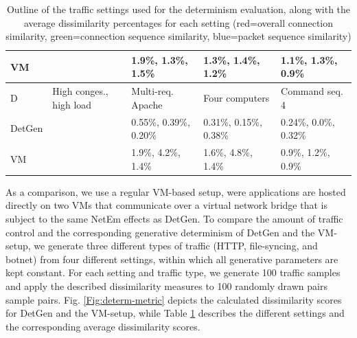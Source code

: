 \documentclass[sigconf]{acmart}
\begin{document}
\begin{table}
\begin{tabular}{p{1cm}|p{3.2cm}|p{2.7cm}|p{2.7cm}|p{2.7cm}}
VM & &\footnotesize \textcolor{myred}{1.9\%}, \textcolor{mygreen}{1.3\%}, \textcolor{myblue}{1.5\%}&
 \footnotesize \textcolor{myred}{1.3\%}, \textcolor{mygreen}{1.4\%}, \textcolor{myblue}{1.2\%}&
 \footnotesize \textcolor{myred}{1.1\%}, \textcolor{mygreen}{1.3\%}, \textcolor{myblue}{0.9\%}\\ \hline \hline
D& High conges., high load & Multi-req. Apache & Four computers & Command seq. 4\\ \hline
DetGen &&\footnotesize \textcolor{myred}{0.55\%}, \textcolor{mygreen}{0.39\%}, \textcolor{myblue}{0.20\%}&
 \footnotesize \textcolor{myred}{0.31\%}, \textcolor{mygreen}{0.15\%}, \textcolor{myblue}{0.38\%}&
 \footnotesize \textcolor{myred}{0.24\%}, \textcolor{mygreen}{0.0\%}, \textcolor{myblue}{0.32\%}\\ \hline \hline
VM & &\footnotesize \textcolor{myred}{1.9\%}, \textcolor{mygreen}{4.2\%}, \textcolor{myblue}{1.4\%}&
 \footnotesize \textcolor{myred}{1.6\%}, \textcolor{mygreen}{4.8\%}, \textcolor{myblue}{1.4\%}&
 \footnotesize \textcolor{myred}{0.9\%}, \textcolor{mygreen}{1.2\%}, \textcolor{myblue}{0.9\%}\\ \hline \hline
\end{tabular}
\caption{Outline of the traffic settings used for the determinism evaluation, along with the average dissimilarity percentages for each setting (red=overall connection similarity, green=connection sequence similarity, blue=packet sequence similarity)}\label{Tab:Dataset}
\end{table}


As a comparison, we use a regular VM-based setup, were applications are hosted directly on two VMs that communicate over a virtual network bridge that is subject to the same NetEm effects as DetGen. To compare the amount of traffic control and the corresponding generative determinism of DetGen and the VM-setup, we generate three different types of traffic (HTTP, file-syncing, and botnet) from four different settings, within which all generative parameters are kept constant. For each setting and traffic type, we generate 100 traffic samples and apply the described dissimilarity measures to 100 randomly drawn pairs sample pairs. Fig. \ref{Fig:determ-metric} depicts the calculated dissimilarity scores for DetGen and the VM-setup, while Table \ref{Tab:Dataset} describes the different settings and the corresponding average dissimilarity scores.
\end{document}
